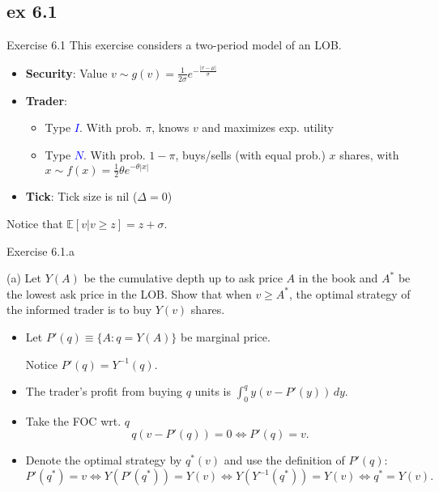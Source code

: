 \documentclass[english,10pt,aspectratio=169]{beamer}
\begin{document}
\subsection{ex 6.1}

\begin{frame}[label=ex1]{Exercise 6.1}
	This exercise considers a two-period model of an LOB.
	\begin{itemize}
		\item \textbf{Security}: Value $v \sim g(v)=\frac{1}{2\sigma} e^{-\frac{|v-\mu|}{\sigma}}$
		\item \textbf{Trader}: 
		\begin{itemize}
			\item Type \textcolor{blue}{$I$}. With prob. $\pi$, knows $v$ and maximizes exp. utility
			\item Type \textcolor{blue}{$N$}. With prob. $1-\pi$, buys/sells (with equal prob.) $x$ shares, with $x \sim f(x)=\frac{1}{2}\theta e^{-\theta |x|}$ 
		\end{itemize}
		\item \textbf{Tick}: Tick size is nil ($\Delta=0$)
	\end{itemize}
	Notice that $\mathbb{E}[v|v \ge z]=z+\sigma$.
\end{frame}


\begin{frame}{Exercise 6.1.a}
	\begin{exampleblock}{}
		(a) Let $Y(A)$ be the cumulative depth up to ask price $A$ in the book and $A^*$ be the lowest ask price in the LOB. Show that when $v \ge A^*$, the optimal strategy of the informed trader is to buy $Y(v)$ shares.
	\end{exampleblock}

	\pause

	\begin{itemize}
		\item Let $P'(q) \equiv \{A: q=Y(A)\}$ be marginal price.
		
		Notice $P'(q) = Y^{-1}(q)$.
		\item The trader's profit from buying $q$ units is $\int_0^q y(v-P'(y)) \, dy.$
		\item Take the FOC wrt. $q$
		\[
		q(v-P'(q))=0 \Leftrightarrow P'(q)=v.
		\]
		\item Denote the optimal strategy by $q^*(v)$ and use the definition of $P'(q)$:
		\[
		P'(q^*)=v \Leftrightarrow Y(P'(q^*))=Y(v) \Leftrightarrow Y(Y^{-1}(q^*))=Y(v) \Leftrightarrow q^*= Y(v).
		\]
	\end{itemize}
\end{frame}
\end{document}
